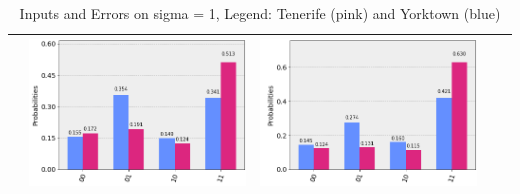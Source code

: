 \documentclass[11pt]{article}
\begin{document}
\begin{table}[h!]
\begin{tabular}{| c | c | c | c | c | }
\begin{minipage}{.215\textwidth}
      \end{minipage}
      &\begin{minipage}{.215\textwidth}
        \includegraphics[width=\linewidth]{img/one_qecc3_Z11.png}
      \end{minipage}
      &\begin{minipage}{.215\textwidth}
        \includegraphics[width=\linewidth]{img/one_qecc3_I11.png}
      \end{minipage}
      \\ \hline
    \end{tabular}
    \caption{Inputs and Errors on sigma = 1, Legend: Tenerife (pink) and Yorktown (blue)}\label{tbl:sig1}
  \end{table}
\end{document}
